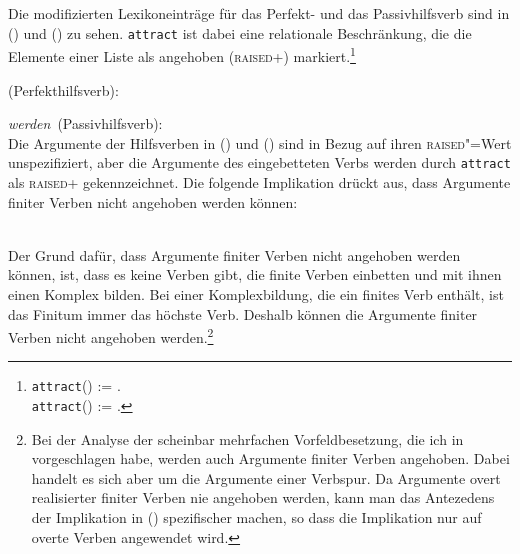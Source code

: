 {Die modifizierten Lexikoneinträge für das Perfekt- und das Passivhilfsverb sind in ()
und () zu sehen. 
\texttt{attract} ist dabei eine relationale Beschränkung, die die Elemente einer Liste als
angehoben (\textsc{raised}+) markiert.\footnote{
\texttt{attract}(\eliste) := \eliste.\\
\texttt{attract}() := .
}

\eas
\mbox{\haben (Perfekthilfsverb):}\\
\zs

\eas
\label{le-werden-passive-da-spirits}%
\mbox{\emph{werden} (Passivhilfsverb):}\\
\zs
Die Argumente der Hilfsverben in () und () sind in Bezug auf ihren \textsc{raised}"=Wert
unspezifiziert, aber die Argumente des eingebetteten Verbs werden durch \texttt{attract}
als \textsc{raised}+ gekennzeichnet. Die folgende Implikation drückt aus, dass Argumente finiter
Verben nicht angehoben werden können:

\eas
{} \impl \\
\hfill{}
\zs
Der Grund dafür, dass Argumente finiter Verben nicht angehoben werden können,
ist, dass es keine Verben gibt, die finite Verben einbetten und mit ihnen einen Komplex bilden.
Bei einer Komplexbildung, die ein finites Verb enthält, ist das Finitum immer das höchste
Verb. Deshalb können die Argumente finiter Verben nicht angehoben werden.\footnote{
  Bei der Analyse der scheinbar mehrfachen Vorfeldbesetzung, die ich in 
  vorgeschlagen habe, werden auch Argumente finiter Verben angehoben. Dabei handelt es sich aber um
  die Argumente einer Verbspur. Da Argumente overt realisierter finiter Verben nie angehoben werden,
  kann man das Antezedens der Implikation in () spezifischer machen, so dass die Implikation
  nur auf overte Verben angewendet wird.%
}

}
